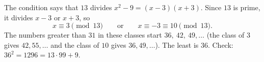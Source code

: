 The condition says that $13$ divides $x^2-9=(x-3)(x+3)$. Since $13$ is prime, it divides $x-3$ or $x+3$, so
\[x\equiv3\pmod{13}\qquad\text{or}\qquad x\equiv-3\equiv10\pmod{13}.\]
The numbers greater than $31$ in these classes start $36,\ 42,\ 49,\dots$ (the class of $3$ gives $42,55,\dots$ and the class of $10$ gives $36,49,\dots$). The least is $\boxed{36}$. Check: $36^2=1296=13\cdot99+9$.
